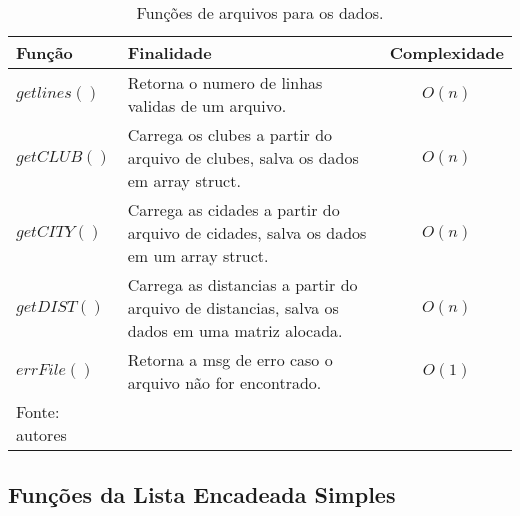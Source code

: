 \documentclass[12pt,a4paper]{article}
\begin{document}
\begin{table}[H]
	\renewcommand{\arraystretch}{1}
	\centering
	\caption{Funções de arquivos para os dados.}
	\label{tab:arquivos}
	\begin{tabular}{p{2.7cm} p{9.5cm} c}
		\toprule 
		Função & Finalidade & Complexidade \\ 
		\midrule
		$getlines()$ & Retorna o numero de linhas validas de um arquivo. & $O(n)$ \\
		$getCLUB()$ & Carrega os clubes a partir do arquivo de clubes, salva os dados em array struct. & $O(n)$ \\
		$getCITY()$ & Carrega as cidades a partir do arquivo de cidades, salva os dados em um array struct. & $O(n)$ \\
		$getDIST()$ & Carrega as distancias a partir do arquivo de distancias, salva os dados em uma matriz alocada. & $O(n)$ \\
		$errFile()$ & Retorna a msg de erro caso o arquivo não for encontrado. & $O(1)$ \\
		\bottomrule
		\footnotesize Fonte: autores
	\end{tabular}
\end{table}

\subsection{Funções da Lista Encadeada Simples}
\end{document}

